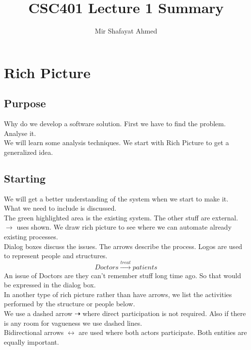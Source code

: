 \documentclass{article}
\title{CSC401 Lecture 1 Summary}
\author{Mir Shafayat Ahmed}
\begin{document}
    \pagecolor[HTML]{FFFFCC}
    \maketitle
    \section*{Rich Picture}
        \subsection*{Purpose}
            Why do we develop a software solution. First we have to find the problem. Analyse it.\\
            We will learn some analysis techniques. We start with Rich Picture to get a generalized idea.
        
        \subsection*{Starting}
            We will get a better understanding of the system when we start to make it.
            \\
            What we need to include is discussed.
            \\
            The green highlighted area is the existing system.
            The other stuff are external.
            \(\rightarrow\) uses shown.
            We draw rich picture to see where we can automate already existing processes.
            \\
            Dialog boxes discuss the issues. The arrows describe the process. Logos are used to represent people and structures.
            \begin{equation*}
                Doctors \xrightarrow{treat} patients
            \end{equation*}
            An issue of Doctors are they can't remember stuff long time ago. So that would be expressed in the dialog box.        
            \\
            In another type of rich picture rather than have arrows, we list the activities performed by the structure or people below.
            \\
            We use a dashed arrow \(\dashrightarrow\) where direct participation is not required. Also if there is any room for vagueness we use dashed lines. 
            \\
            Bidirectional arrows \(\leftrightarrow\) are used where both actors participate. Both entities are equally important.
\end{document}
